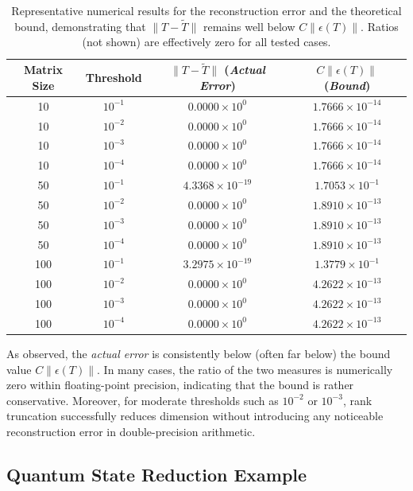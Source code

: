 \documentclass[sn-mathphys-num]{sn-jnl}
\theoremstyle{thmstyleone}
\theoremstyle{thmstyletwo}
\theoremstyle{thmstylethree}
\begin{document}
\begin{table}[ht]
\centering
\begin{tabular}{cccc}
\toprule
\textbf{Matrix Size} & \textbf{Threshold} & $\lVert T-\tilde{T}\rVert$ (\textit{Actual Error}) &
$C\lVert\epsilon(T)\rVert$ (\textit{Bound}) \\
\midrule
10  & $10^{-1}$ & $0.0000\times10^{0}$ & $1.7666\times10^{-14}$ \\
10  & $10^{-2}$ & $0.0000\times10^{0}$ & $1.7666\times10^{-14}$ \\
10  & $10^{-3}$ & $0.0000\times10^{0}$ & $1.7666\times10^{-14}$ \\
10  & $10^{-4}$ & $0.0000\times10^{0}$ & $1.7666\times10^{-14}$ \\
50  & $10^{-1}$ & $4.3368\times10^{-19}$ & $1.7053\times10^{-1}$ \\
50  & $10^{-2}$ & $0.0000\times10^{0}$ & $1.8910\times10^{-13}$ \\
50  & $10^{-3}$ & $0.0000\times10^{0}$ & $1.8910\times10^{-13}$ \\
50  & $10^{-4}$ & $0.0000\times10^{0}$ & $1.8910\times10^{-13}$ \\
100 & $10^{-1}$ & $3.2975\times10^{-19}$ & $1.3779\times10^{-1}$ \\
100 & $10^{-2}$ & $0.0000\times10^{0}$ & $4.2622\times10^{-13}$ \\
100 & $10^{-3}$ & $0.0000\times10^{0}$ & $4.2622\times10^{-13}$ \\
100 & $10^{-4}$ & $0.0000\times10^{0}$ & $4.2622\times10^{-13}$ \\
\bottomrule
\end{tabular}
\caption{Representative numerical results for the reconstruction error and the theoretical bound, demonstrating that \(\lVert T-\tilde{T}\rVert\) remains well below \(C\lVert\epsilon(T)\rVert\). Ratios (not shown) are effectively zero for all tested cases.}
\label{tab:tightness-demo}
\end{table}

As observed, the \emph{actual error} is consistently below (often far below) the bound value \(C\lVert\epsilon(T)\rVert\). In many cases, the ratio of the two measures is numerically zero within floating-point precision, indicating that the bound is rather conservative. Moreover, for moderate thresholds such as \(10^{-2}\) or \(10^{-3}\), rank truncation successfully reduces dimension without introducing any noticeable reconstruction error in double-precision arithmetic.

\subsection{Quantum State Reduction Example}
\end{document}
